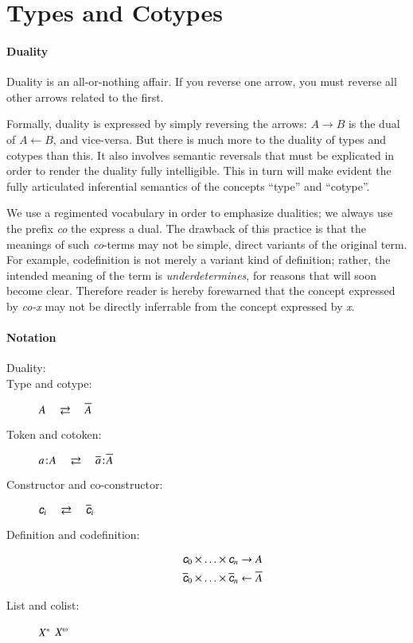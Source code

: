 \section{Types and Cotypes}\label{sec:types}

\paragraph{Duality}  Duality is an all-or-nothing affair. If you reverse one arrow, you must reverse all other arrows related to the first.

Formally, duality is expressed by simply reversing the arrows:
\(A\rightarrow B\) is the dual of \(A\leftarrow B\), and vice-versa.
But there is much more to the duality of types and cotypes than this.
It also involves semantic reversals that must be explicated in order
to render the duality fully intelligible. This in turn will make
evident the fully articulated inferential semantics of the concepts
``type'' and ``cotype''.

We use a regimented vocabulary in order to emphasize dualities; we
always use the prefix \textit{co} the express a dual. The drawback of
this practice is that the meanings of such \textit{co}-terms may not
be simple, direct variants of the original term. For example,
codefinition is not merely a variant kind of definition; rather, the
intended meaning of the term is \textit{underdetermines}, for reasons
that will soon become clear. Therefore reader is hereby forewarned
that the concept expressed by \textit{co-x} may not be directly
inferrable from the concept expressed by \textit{x}.

\paragraph{Notation}

\begin{description}
\item[Duality:] \dual
\item[Type and cotype:]\hspace{2em}\(A\hspace{1em}\rightleftarrows\hspace{1em} \overline{A}\)
\item[Token and cotoken:] \(a\hspace{1pt}\mathpunct{:}\hspace{-1pt}A\hspace{1em}\rightleftarrows\hspace{1em}
  \overline{a}\hspace{1pt}\mathpunct{:}\hspace{-1pt}\overline{A}\)
    \item[Constructor and co-constructor:] \(\ctor{i}\dual \coctor{i}\)
    \item[Definition and codefinition:]

      \begin{align}
       \ctor{0}\times\ldots\times\ctor{n} & \rightarrow A \nonumber \\
       \coctor{0}\times\ldots\times\coctor{n} & \leftarrow \cotype{A} \nonumber
      \end{align}
      \item[List and colist:] \({X^{*}}\) \dual \(\colist{X}\)
\end{description}

